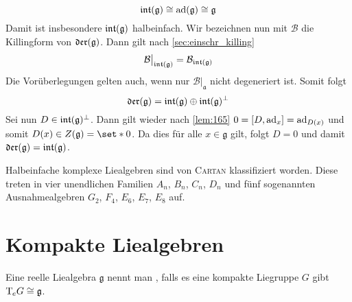 \begin{beweis}
\begin{enumerate}[1),itemsep=0pt]
		\[
			\intAlg(\mathfrak{g}) \cong \ad(\mathfrak{g}) \cong \mathfrak{g}
		\]
		Damit ist insbesondere $\intAlg(\mathfrak{g})$ halbeinfach.
		Wir bezeichnen nun mit $\mathcal{B}$ die Killingform von $\Der(\mathfrak{g})$.
		Dann gilt nach \cref{sec:einschr_killing}
		\[
			\mathcal{B}\big|_{\intAlg(\mathfrak{g})} = \mathcal{B}_{\intAlg(\mathfrak{g})}
		\]
		Die Vorüberlegungen  gelten auch, wenn nur $\mathcal{B}|_{\mathfrak{a}}$ nicht degeneriert ist.
		Somit folgt
		\[
			\Der(\mathfrak{g}) = \intAlg(\mathfrak{g}) \oplus \intAlg(\mathfrak{g})^\perp
		\]
		Sei nun $D \in \intAlg(\mathfrak{g})^\bot$.
		Dann gilt wieder nach \autoref{lem:165} $0= \benbrace*{D,\ad_x} = \ad_{D(x)}$ und somit $D(x) \in Z(\mathfrak{g}) = \set*{0}$.
		Da dies für alle $x \in \mathfrak{g}$ gilt, folgt $D=0$ und damit $\Der(\mathfrak{g}) = \intAlg(\mathfrak{g})$.\qedhere
	\end{enumerate}
\end{beweis}

\begin{bemerkung*}[{name=[Klassifikation der komplexen halbeinfachen Liealgebren]}]
	Halbeinfache komplexe Liealgebren sind von \textsc{Cartan} klassifiziert worden.
	Diese treten in vier unendlichen Familien $A_n$, $B_n$, $C_n$, $D_n$ und fünf sogenannten Ausnahmealgebren $G_2$, $F_4$, $E_6$, $E_7$, $E_8$ auf.
\end{bemerkung*}

\section{Kompakte Liealgebren} %
\label{sec:23}

\begin{definition}[{name=[{kompakte Liealgebra}]}]
	Eine reelle Liealgebra $\mathfrak{g}$ nennt man , falls es eine kompakte Liegruppe $G$ gibt $\Tmap_e G \cong \mathfrak{g}$. 
\end{definition}

